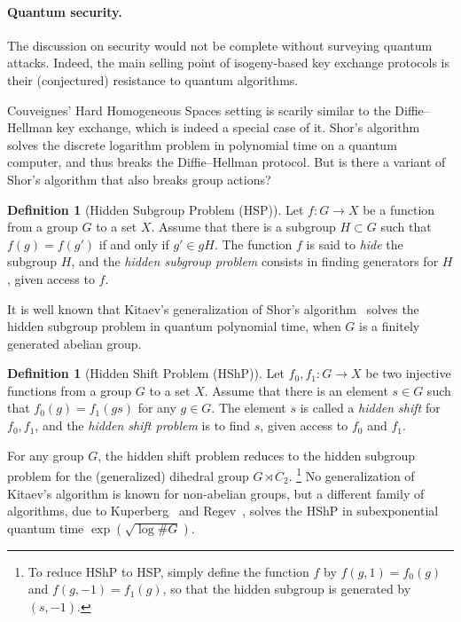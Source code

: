 \documentclass[10pt]{article}
\theoremstyle{plain}
\theoremstyle{definition}
\newtheorem{definition}[theorem]{Definition}
\begin{document}
\paragraph{Quantum security.}
The discussion on security would not be complete without surveying
quantum attacks. %
Indeed, the main selling point of isogeny-based key exchange protocols
is their (conjectured) resistance to quantum algorithms. %

Couveignes' Hard Homogeneous Spaces setting is scarily similar to the
Diffie--Hellman key exchange, which is indeed a special case of it. %
Shor's algorithm~\cite{FOCS:Shor94} solves the discrete logarithm
problem in polynomial time on a quantum computer, and thus breaks the
Diffie--Hellman protocol. %
But is there a variant of Shor's algorithm that also breaks group
actions? %

\begin{definition}[Hidden Subgroup Problem (HSP)]
  Let $f:G→X$ be a function from a group $G$ to a set $X$. %
  Assume that there is a subgroup $H⊂G$ such that $f(g)=f(g')$ if and
  only if $g'∈gH$. %
  The function $f$ is said to \emph{hide} the subgroup $H$, and the
  \emph{hidden subgroup problem} consists in finding generators for
  $H$, given access to $f$.
\end{definition}

It is well known that Kitaev's generalization of Shor's
algorithm~\cite{kitaev1995hsp} solves the hidden subgroup problem in
quantum polynomial time, when $G$ is a finitely generated abelian
group. %

\begin{definition}[Hidden Shift Problem (HShP)]
  Let $f_0,f_1:G→X$ be two injective functions from a group $G$ to a
  set $X$. %
  Assume that there is an element $s∈G$ such that $f_0(g)=f_1(gs)$ for
  any $g∈G$. %
  The element $s$ is called a \emph{hidden shift} for $f_0,f_1$, and
  the \emph{hidden shift problem} is to find $s$, given access to
  $f_0$ and $f_1$. %
\end{definition}

For any group $G$, the hidden shift problem reduces to the hidden
subgroup problem for the (generalized) dihedral group $G\rtimes C_2$.%
\footnote{To reduce HShP to HSP, simply define the function $f$ by
  $f(g,1) = f_0(g)$ and $f(g,-1) = f_1(g)$, so that the hidden
  subgroup is generated by $(s,-1)$.} %
No generalization of Kitaev's algorithm is known for non-abelian
groups, but a different family of algorithms, due to
Kuperberg~\cite{Kup,Kuperberg2013} and Regev~\cite{regev04}, solves
the HShP in subexponential quantum time $\exp(\sqrt{\log\#G})$. %
\end{document}
